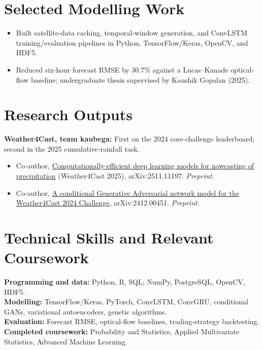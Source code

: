\section{Selected Modelling Work}
\begin{itemize}
  \item Built satellite-data caching, temporal-window generation, and ConvLSTM training/evaluation pipelines in Python, TensorFlow/Keras, OpenCV, and HDF5.
  \item Reduced six-hour forecast RMSE by 30.7\% against a Lucas--Kanade optical-flow baseline; undergraduate thesis supervised by Kaushik Gopalan (2025).
\end{itemize}
\section{Research Outputs}
\textbf{Weather4Cast, team kaubega:} First on the 2024 core-challenge leaderboard; second in the 2025 cumulative-rainfall task.\par
\begin{itemize}
  \item Co-author, \href{https://arxiv.org/abs/2511.11197}{Computationally-efficient deep learning models for nowcasting of precipitation} (Weather4Cast 2025), arXiv:2511.11197. \textit{Preprint.}
  \item Co-author, \href{https://arxiv.org/abs/2412.00451}{A conditional Generative Adversarial network model for the Weather4Cast 2024 Challenge}, arXiv:2412.00451. \textit{Preprint.}
\end{itemize}
\section{Technical Skills and Relevant Coursework}
\textbf{Programming and data:} Python, R, SQL; NumPy, PostgreSQL, OpenCV, HDF5.\\
\textbf{Modelling:} TensorFlow/Keras, PyTorch, ConvLSTM, ConvGRU, conditional GANs, variational autoencoders, genetic algorithms.\\
\textbf{Evaluation:} Forecast RMSE, optical-flow baselines, trading-strategy backtesting.\\
\textbf{Completed coursework:} Probability and Statistics, Applied Multivariate Statistics, Advanced Machine Learning.

